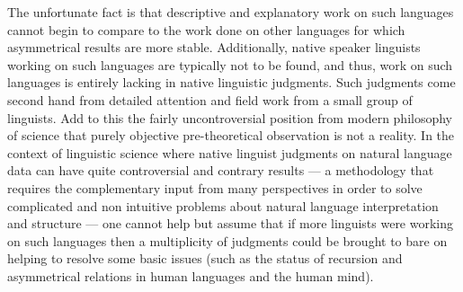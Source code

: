 \documentclass[11pt]{article}
\begin{document}
The unfortunate fact is that descriptive and explanatory work on such languages cannot begin to compare to the work done on other languages for which asymmetrical results are more stable. Additionally, native speaker linguists working on such languages are typically not to be found, and thus, work on such languages is entirely lacking in native linguistic judgments. Such judgments come second hand from detailed attention and field work from a small group of linguists. Add to this the fairly uncontroversial position from modern philosophy of science that purely objective pre-theoretical observation is not a reality. In the context of linguistic science where native linguist judgments on natural language data can have quite controversial and contrary results --- a methodology that requires the complementary input from many perspectives in order to solve complicated and non intuitive problems about natural language interpretation and structure --- one cannot help but assume that if more linguists were working on such languages then a multiplicity of judgments could be brought to bare on helping to resolve some basic issues (such as the status of recursion and asymmetrical relations in human languages and the human mind).
\end{document}
